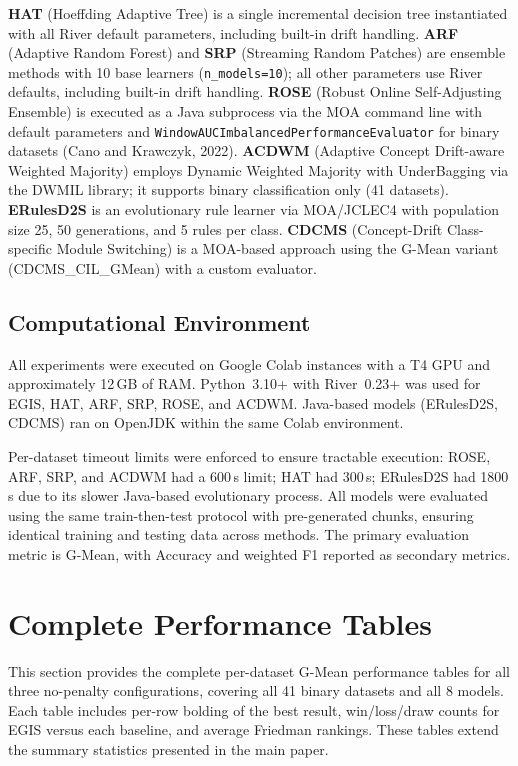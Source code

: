 \documentclass[lettersize,10pt]{article}
\begin{document}
\textbf{HAT} (Hoeffding Adaptive Tree) is a single incremental decision tree instantiated with all River default parameters, including built-in drift handling. \textbf{ARF} (Adaptive Random Forest) and \textbf{SRP} (Streaming Random Patches) are ensemble methods with 10 base learners (\texttt{n\_models=10}); all other parameters use River defaults, including built-in drift handling. \textbf{ROSE} (Robust Online Self-Adjusting Ensemble) is executed as a Java subprocess via the MOA command line with default parameters and \texttt{WindowAUCImbalancedPerformanceEvaluator} for binary datasets (Cano and Krawczyk, 2022). \textbf{ACDWM} (Adaptive Concept Drift-aware Weighted Majority) employs Dynamic Weighted Majority with UnderBagging via the DWMIL library; it supports binary classification only (41 datasets). \textbf{ERulesD2S} is an evolutionary rule learner via MOA/JCLEC4 with population size 25, 50 generations, and 5 rules per class. \textbf{CDCMS} (Concept-Drift Class-specific Module Switching) is a MOA-based approach using the G-Mean variant (CDCMS\_CIL\_GMean) with a custom evaluator.

\subsection{Computational Environment}
\label{sec:s1_environment}
All experiments were executed on Google Colab instances with a T4 GPU and approximately 12\,GB of RAM. Python~3.10+ with River~0.23+ was used for EGIS, HAT, ARF, SRP, ROSE, and ACDWM. Java-based models (ERulesD2S, CDCMS) ran on OpenJDK within the same Colab environment.

Per-dataset timeout limits were enforced to ensure tractable execution: ROSE, ARF, SRP, and ACDWM had a 600\,s limit; HAT had 300\,s; ERulesD2S had 1800\,s due to its slower Java-based evolutionary process. All models were evaluated using the same train-then-test protocol with pre-generated chunks, ensuring identical training and testing data across methods. The primary evaluation metric is G-Mean, with Accuracy and weighted F1 reported as secondary metrics.


\section{Complete Performance Tables}
\label{sec:s2}
This section provides the complete per-dataset G-Mean performance tables for all three no-penalty configurations, covering all 41 binary datasets and all 8 models. Each table includes per-row bolding of the best result, win/loss/draw counts for EGIS versus each baseline, and average Friedman rankings. These tables extend the summary statistics presented in the main paper.
\end{document}
